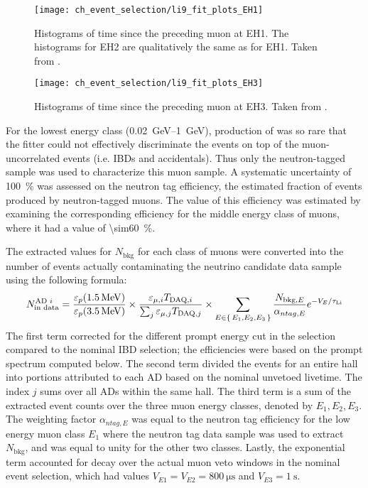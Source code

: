 \begin{figure}
    \centering
    \texttt{[image: ch\_event\_selection/li9\_fit\_plots\_EH1]}
    \caption{
        Histograms of time since the preceding muon at EH1.
        The histograms for EH2 are qualitatively the same as for EH1.
        Taken from \cite{jinjing_2020may}.
    }
    \label{fig:li9_fits_EH1}
\end{figure}

\begin{figure}
    \centering
    \texttt{[image: ch\_event\_selection/li9\_fit\_plots\_EH3]}
    \caption{
        Histograms of time since the preceding muon at EH3.
        Taken from \cite{jinjing_2020may}.
    }
    \label{fig:li9_fits_EH3}
\end{figure}
For the lowest energy class (\SIrange{0.02}{1}{\GeV}),
production of \li{} was so rare that the fitter
could not effectively discriminate the \li{} events
on top of the muon-uncorrelated events (i.e. IBDs and accidentals).
Thus only the neutron-tagged sample was used to characterize this muon sample.
A systematic uncertainty of \SI{100}{\percent} was assessed
on the neutron tag efficiency,
the estimated fraction of \li{} events produced by neutron-tagged muons.
The value of this efficiency was estimated by examining
the corresponding efficiency for the middle energy class of muons,
where it had a value of \SI{\sim60}{\percent}.

The extracted values for $N_\text{bkg}$ for each class of muons
were converted into the number of \li{} events
actually contaminating the neutrino candidate data sample
using the following formula:
\begin{equation}\label{eq:li9_rate_conv}
    N_\text{in data}^{\text{AD }i} =
    \frac{\varepsilon_p(\SI{1.5}{\MeV})}{\varepsilon_p(\SI{3.5}{\MeV})}
    \times
    \frac{\varepsilon_{\mu,i} T_{\text{DAQ},i}}{
        \sum_j \varepsilon_{\mu,j} T_{\text{DAQ},j}
    }
    \times
    \sum_{E\in\set{E_1,E_2,E_3}}
    \frac{N_{\text{bkg},E}}{\alpha_{ntag, E}} e^{-V_E/\tau_{\text{Li}}}
\end{equation}
The first term corrected for the different prompt energy cut
in the \li{} selection compared to the nominal IBD selection;
the efficiencies were based on the \li{} prompt spectrum computed below.
The second term divided the events for an entire hall
into portions attributed to each AD based on the nominal unvetoed livetime.
The index $j$ sums over all ADs within the same hall.
The third term is a sum of the extracted event counts
over the three muon energy classes, denoted by $E_1,E_2,E_3$.
The weighting factor $\alpha_{ntag,E}$ was equal to
the neutron tag efficiency for the low energy muon class $E_1$
where the neutron tag data sample was used to extract $N_\text{bkg}$,
and was equal to unity for the other two classes.
Lastly, the exponential term accounted for \li{} decay
over the actual muon veto windows in the nominal event selection,
which had values $V_{E1} = V_{E2} = \SI{800}{\us}$
and $V_{E3} = \SI{1}{\s}$.

